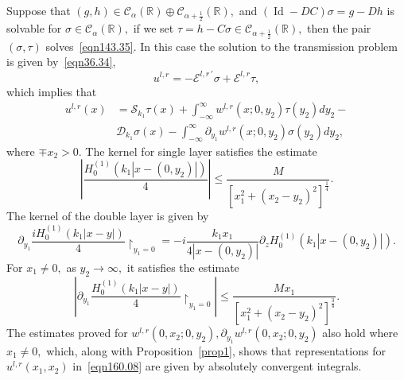 \documentclass[11pt]{article}
\newcommand\cE{\mathcal E}
\newcommand\cC{\mathcal{C}}
\newcommand\cS{\mathcal{S}}
\newcommand\cD{\mathcal{D}}
\newcommand\bbR{\mathbb R}
\newcommand\pa{\partial}
\newcommand\restrictedto{\upharpoonright}
\newcommand\Id{\operatorname{Id}}
\theoremstyle{definition}
\theoremstyle{remark}
\begin{document}
Suppose that $(g,h)\in \cC_{\alpha}(\bbR)\oplus \cC_{\alpha+\frac 12}(\bbR),$ and
$  (\Id-DC)\sigma=g-Dh$
is solvable for $\sigma\in\cC_{\alpha}(\bbR),$  if we set $\tau=h-C\sigma\in
\cC_{\alpha+\frac 12}(\bbR),$ then the pair
$(\sigma,\tau)$  solves~\eqref{eqn143.35}.  In this case the solution to the
transmission problem is given by~\eqref{eqn36.34},
 \begin{equation}
  u^{l,r}=-\cE^{l,r\,'}\sigma+\cE^{l,r}\tau,
\end{equation}
which implies that
\begin{equation}\label{eqn160.08}
  \begin{split}
  u^{l,r}(x)
 &=\cS_{k_1}\tau(x)+\int_{-\infty}^{\infty}w^{l,r}(x;0,y_2)\tau(y_2)dy_2-\\
 &\cD_{k_1}\sigma(x)-\int_{-\infty}^{\infty}\pa_{y_1}w^{l,r}(x;0,y_2)\sigma(y_2)dy_2,
  \end{split}
\end{equation}
where $\mp x_2>0.$  The kernel for
single layer satisfies the estimate
\begin{equation}
 \left| \frac{H^{(1)}_0(k_1|x-(0,y_2)|)}{4}\right|\leq
 \frac{M}{[x_1^2+(x_2-y_2)^2]^{\frac 14}}. 
\end{equation}
The kernel of the double layer is given by
\begin{equation}
  \pa_{y_1}\frac{iH^{(1)}_0(k_1|x-y|)}{4}\restrictedto_{y_1=0}=-i\frac{k_1x_1}{4|x-(0,y_2)|}
  \pa_zH^{(1)}_0(k_1|x-(0,y_2)|).
\end{equation}
For $x_1\neq 0,$ as $y_2\to\infty,$ it satisfies the estimate
\begin{equation}
  \left|\pa_{y_1}\frac{H^{(1)}_0(k_1|x-y|)}{4}\restrictedto_{y_1=0}\right|\leq
  \frac{Mx_1}{[x_1^2+(x_2-y_2)^2]^{\frac 34}}.
\end{equation}
The estimates proved for
$w^{l,r}(0,x_2;0,y_2),\pa_{y_1}w^{l,r}(0,x_2;0,y_2)$ also hold where
$x_1\neq 0,$ which, along with Proposition~\ref{prop1}, shows that
representations for $u^{l,r}(x_1,x_2)$ in~\eqref{eqn160.08} are given by
absolutely convergent integrals.
\end{document}
